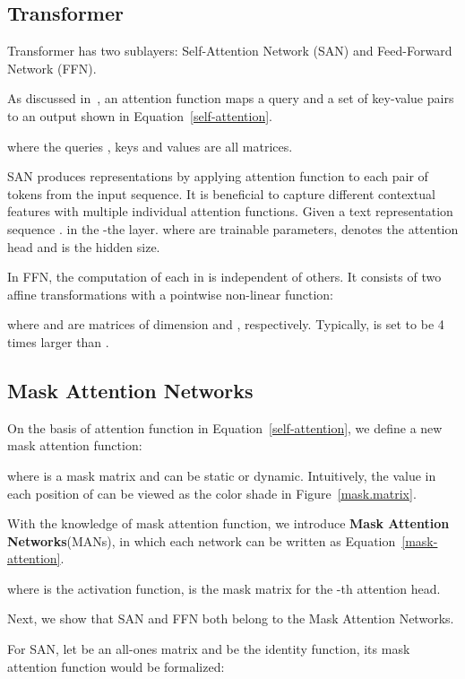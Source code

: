 \documentclass[11pt]{article}
\begin{document}
\subsection{Transformer}
\label{transformer-layer}
Transformer has two sublayers: Self-Attention Network (SAN) and Feed-Forward Network (FFN).

As discussed in~\citet{vaswani2017attention}, an attention function maps a query and a set of key-value pairs to an output shown in Equation~\ref{self-attention}.

where the queries , keys  and values  are all matrices. 

{\normalsize \setlength{\lineskip}{2em} SAN produces representations by applying attention function to each pair of tokens from the input sequence. It is beneficial to capture different contextual features with multiple individual attention functions. Given a text representation sequence . } in the -the layer.
where  are trainable parameters,  denotes the attention head and  is the hidden size.

In FFN, the computation of each  in  is independent of others.
It consists of two affine transformations with a pointwise non-linear function:

where  and  are matrices of dimension  and , respectively. Typically,  is set to be 4 times larger than .

\subsection{Mask Attention Networks}
\label{mask-attention-network-family}
On the basis of attention function in Equation~\ref{self-attention}, we define a new mask attention function:

where  is a mask matrix and can be static or dynamic. Intuitively, the value in each position of  can be viewed as the color shade in Figure~\ref{mask.matrix}.

With the knowledge of mask attention function, we introduce \textbf{Mask Attention Networks}(MANs), in which each network can be written as Equation~\ref{mask-attention}.

where  is the activation function,  is the mask matrix for the -th attention head.

Next, we show that SAN and FFN both belong to the Mask Attention Networks.

For SAN, let  be an all-ones matrix and  be the identity function, its mask attention function would be formalized:
\end{document}
